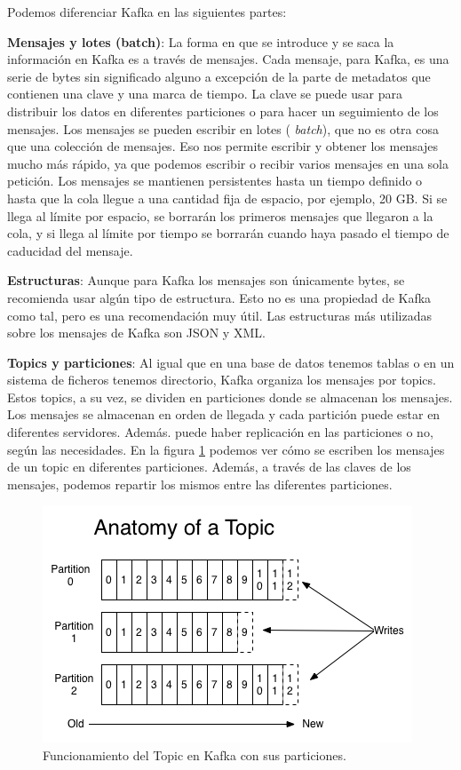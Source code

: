 Podemos diferenciar Kafka en las siguientes partes:

\textbf{Mensajes y lotes (batch)}: La forma en que se introduce y se saca
la información en Kafka es a través de mensajes. Cada mensaje, para Kafka,
es una serie de bytes sin significado alguno a excepción de la parte de
metadatos que contienen una clave y una marca de tiempo. La clave se puede
usar para distribuir los datos en diferentes particiones o para hacer un
seguimiento de los mensajes. Los mensajes se pueden escribir en lotes ({\em
  batch}), que no es otra cosa que una colección de mensajes. Eso nos
permite escribir y obtener los mensajes mucho más rápido, ya que podemos
escribir o recibir varios mensajes en una sola petición. Los mensajes se
mantienen persistentes hasta un tiempo definido o hasta que la cola llegue
a una cantidad fija de espacio, por ejemplo, 20 GB. Si se llega al límite
por espacio, se borrarán los primeros mensajes que llegaron a la cola, y si
llega al límite por tiempo se borrarán cuando haya pasado el tiempo de
caducidad del mensaje.

\textbf{Estructuras}: Aunque para Kafka los mensajes son únicamente bytes,
se recomienda usar algún tipo de estructura. Esto no es una propiedad de
Kafka como tal, pero es una recomendación muy útil. Las estructuras más
utilizadas sobre los mensajes de Kafka son JSON y XML.

\textbf{Topics y particiones}: Al igual que en una base de datos tenemos
tablas o en un sistema de ficheros tenemos directorio, Kafka organiza los
mensajes por topics. Estos topics, a su vez, se dividen en particiones
donde se almacenan los mensajes. Los mensajes se almacenan en orden de
llegada y cada partición puede estar en diferentes servidores. Además.
puede haber replicación en las particiones o no, según las necesidades. En
la figura \ref{Kfk-img-1} \cite{Kfk-2} podemos ver cómo se escriben los
mensajes de un topic en diferentes particiones. Además, a través de las
claves de los mensajes, podemos repartir los mismos entre las diferentes
particiones.


\begin{figure}[htp]
\centering
\includegraphics[scale=0.75]{Imagenes/kafka1.png}
\caption{Funcionamiento del Topic en Kafka con sus particiones.}
\label{Kfk-img-1}
\end{figure}

